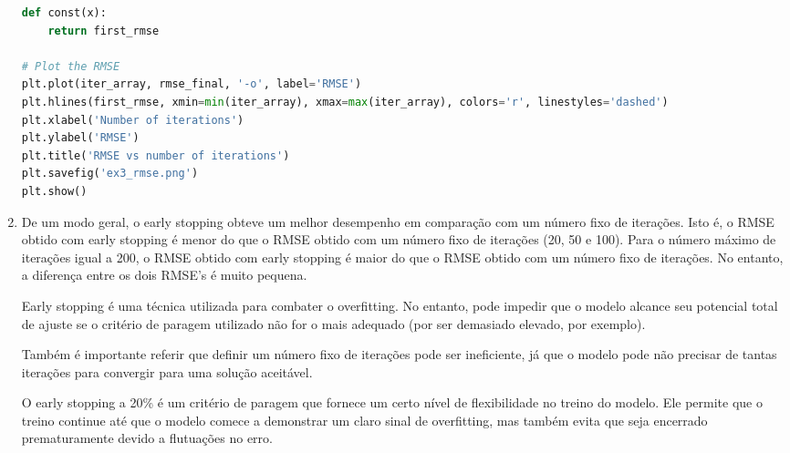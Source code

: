 \documentclass[a4paper,12pt]{article} %
\begin{document}
\begin{enumerate}
\begin{lstlisting}[language=Python]
def const(x):
    return first_rmse

# Plot the RMSE
plt.plot(iter_array, rmse_final, '-o', label='RMSE')
plt.hlines(first_rmse, xmin=min(iter_array), xmax=max(iter_array), colors='r', linestyles='dashed')
plt.xlabel('Number of iterations') 
plt.ylabel('RMSE')
plt.title('RMSE vs number of iterations')
plt.savefig('ex3_rmse.png')
plt.show()
\end{lstlisting}

\item De um modo geral, o early stopping obteve um melhor desempenho em comparação com um número fixo de iterações. Isto é, o RMSE obtido com early stopping é menor do que o RMSE obtido com um número fixo de iterações (20, 50 e 100).
Para o número máximo de iterações igual a 200, o RMSE obtido com early stopping é maior do que o RMSE obtido com um número fixo de iterações. No entanto, a diferença entre os dois RMSE's é muito pequena.

Early stopping é uma técnica utilizada para combater o overfitting. No entanto, pode impedir que o modelo alcance seu potencial total de ajuste se o critério de paragem utilizado não for o mais adequado (por ser demasiado elevado, por exemplo).

Também é importante referir que definir um número fixo de iterações pode ser ineficiente, já que o modelo pode não precisar de tantas iterações para convergir para uma solução aceitável. 

O early stopping a 20\% é um critério de paragem que fornece um certo nível de flexibilidade no treino do modelo. Ele permite que o treino continue até que o modelo comece a demonstrar um claro sinal de overfitting, mas também evita que seja encerrado prematuramente devido a flutuações no erro.


\end{enumerate}
\end{document}
